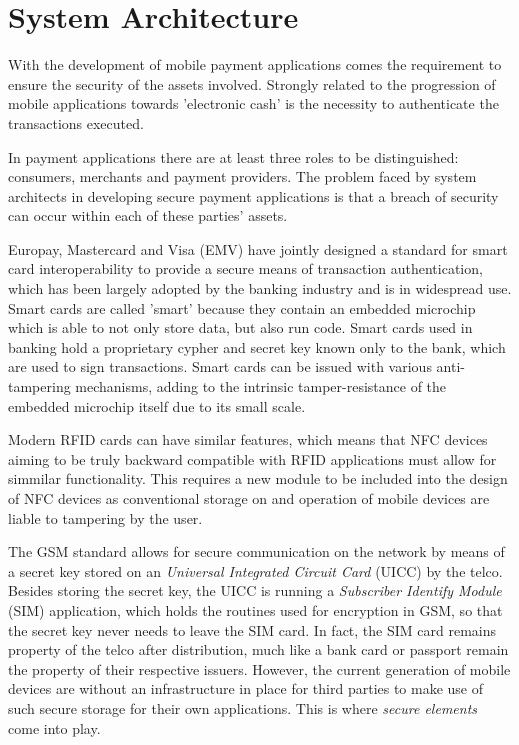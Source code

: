 \section{System Architecture}
\label{chap:hardware_architecture}
With the development of mobile payment applications comes the requirement to ensure the security of the assets involved.
Strongly related to the progression of mobile applications towards 'electronic cash' is the necessity to authenticate the transactions executed. \cite{herzberg2003payments}

In payment applications there are at least three roles to be distinguished: consumers, merchants and payment providers.
The problem faced by system architects in developing secure payment applications is that a breach of security can occur within each of these parties' assets.

Europay, Mastercard and Visa (EMV) have jointly designed a standard for smart card interoperability to provide a secure means of transaction authentication, which has been largely adopted by the banking industry and is in widespread use.
Smart cards are called 'smart' because they contain an embedded microchip which is able to not only store data, but also run code.
Smart cards used in banking hold a proprietary cypher and secret key known only to the bank, which are used to sign transactions.
Smart cards can be issued with various anti-tampering mechanisms, adding to the intrinsic tamper-resistance of the embedded microchip itself due to its small scale.

Modern RFID cards can have similar features, which means that NFC devices aiming to be truly backward compatible with RFID applications must allow for simmilar functionality.
This requires a new module to be included into the design of NFC devices as conventional storage on and operation of mobile devices are liable to tampering by the user.

The GSM standard allows for secure communication on the network by means of a secret key stored on an \textit{Universal Integrated Circuit Card} (UICC) by the telco. %
Besides storing the secret key, the UICC is running a \textit{Subscriber Identify Module} (SIM) application, which holds the routines used for encryption in GSM, so that the secret key never needs to leave the SIM card. %
In fact, the SIM card remains property of the telco after distribution, much like a bank card or passport remain the property of their respective issuers. %
However, the current generation of mobile devices are without an infrastructure in place for third parties to make use of such secure storage for their own applications.
This is where \textit{secure elements} come into play.

